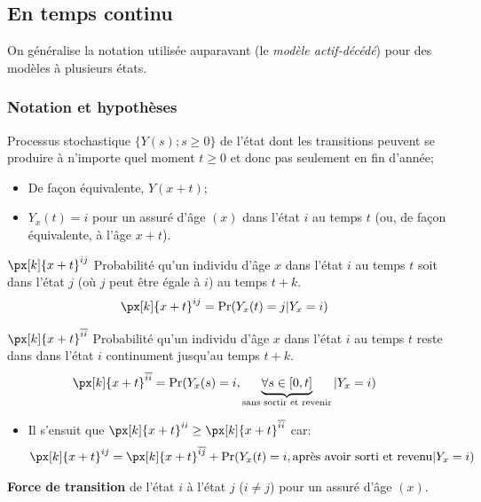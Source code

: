 \documentclass[10pt, french]{article}
\begin{document}
\begin{multicols*}{2}
\subsection*{En temps continu}
On généralise la notation utilisée auparavant (le \textit{modèle actif-décédé}) pour des modèles à plusieurs états.

\subsubsection*{Notation et hypothèses}
\begin{description}
	\item[$Y_{x}(t)$]	Processus stochastique $\{Y(s); s \ge 0\}$ de l'état dont les transitions peuvent se produire à n'importe quel moment $t \ge 0$ et donc pas seulement en fin d'année;
		\begin{itemize}[leftmargin = *]
		\item	De façon équivalente, $Y(x + t)$;
		\item	$Y_{x}(t) = i$ pour un assuré d'âge $(x)$ dans l'état $i$ au temps $t$ (ou, de façon équivalente, à l'âge $x + t$).
		\end{itemize}
	\item	$\px[k]{x + t}^{ij}$	Probabilité qu'un individu d'âge $x$ dans l'état $i$ au temps $t$ soit dans l'état $j$ (où $j$ peut être égale à $i$) au temps $t + k$.
		\begin{align*}
		\px[k]{x + t}^{ij}
		&=	\Pr(Y_{x}(t) = j | Y_{x} = i)
		\end{align*}
	\item	$\px[k]{x + t}^{\overline{ii}}$	Probabilité qu'un individu d'âge $x$ dans l'état $i$ au temps $t$ reste dans dans l'état $i$ continument jusqu'au temps $t + k$.
		\begin{align*}
		\px[k]{x + t}^{\overline{ii}}
		&=	\Pr(Y_{x}(s) = i, \underbrace{\forall s \in [0, t]}_{\text{sans sortir et revenir}} | Y_{x} = i)
		\end{align*}
		\begin{itemize}[leftmargin = *]
			\item	Il s'ensuit que $\px[k]{x + t}^{ii} \geq \px[k]{x + t}^{\overline{ii}}$ car:
				\begin{align*}
				\px[k]{x + t}^{ij}
				&=	\px[k]{x + t}^{\overline{ij}} + \Pr(Y_{x}(t) = i, \text{après avoir sorti et revenu} | Y_{x} = i)	\\
				\end{align*}
		\end{itemize}
	\item[$\mu_{x}^{ij}$]	\textbf{Force de transition} de l'état $i$ à l'état $j$ (\underline{$i \neq j$}) pour un assuré d'âge $(x)$.

\end{description}
\end{multicols*}
\end{document}
